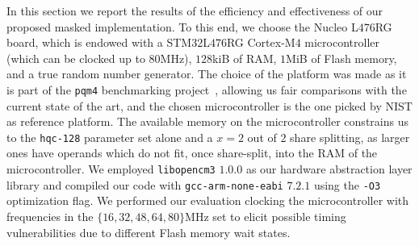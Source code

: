 In this section we report the results of the efficiency and effectiveness of our
proposed masked implementation.
To this end, we choose the Nucleo L$476$RG board, which is endowed with a
STM$32$L$476$RG Cortex-M$4$ microcontroller (which can be clocked up to $80$MHz), 
$128$kiB of RAM, $1$MiB of Flash memory, and a true random number generator.
The choice of the platform was made as it is part of the \texttt{pqm4} benchmarking
project~\cite{PQM4}, allowing us fair comparisons with the current state of the art, 
and the chosen microcontroller is the one picked by NIST as reference platform.
%
The available memory on the microcontroller constrains us to the 
\texttt{hqc-128} parameter set alone and a $x=2$ out of $2$ share splitting, as 
larger ones have operands which do not fit, once share-split, into the RAM of
the microcontroller. 
We employed \texttt{libopencm3} $1$.$0$.$0$ as our hardware abstraction layer 
library and compiled our code with \texttt{gcc-arm-none-eabi} $7$.$2$.$1$
using the \texttt{-O3} optimization flag. 
We performed our evaluation clocking the microcontroller with frequencies in the 
$\{16, 32, 48, 64, 80\}$MHz set to elicit possible timing vulnerabilities due
to different Flash memory wait states.

